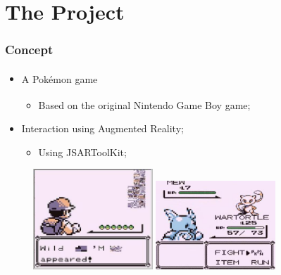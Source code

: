 \documentclass{beamer}
\begin{document}
\section{The Project}
\begin{frame}
	\frametitle{Concept}
	\begin{itemize}
		\item{A Pokémon\textsuperscript{\textregistered} game
		\begin{itemize}
			\item{Based on the original Nintendo\textsuperscript{\textregistered} Game Boy\textsuperscript{\textregistered} game;}
		\end{itemize}
		}
		\item{Interaction using Augmented Reality;
		\begin{itemize}
			\item{Using JSARToolKit;}
		\end{itemize}
		}
	\end{itemize}
	
	\begin{figure}
		\begin{center}
			\includegraphics[width=0.4\textwidth]{slides/images/missingno.jpeg}
			\;
			\includegraphics[width=0.4\textwidth]{slides/images/mewbug.png}
		\end{center}
	\end{figure}
\end{frame}
\end{document}
